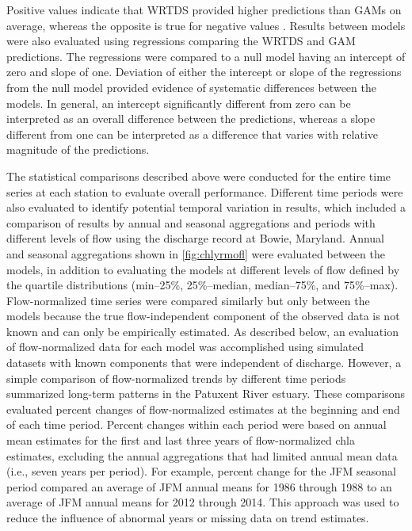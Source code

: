 \documentclass[letterpaper,12pt,oneside]{article}\usepackage[]{graphicx}\usepackage[]{color}
\begin{document}
Positive values indicate that \ac{WRTDS} provided higher predictions than \acp{GAM} on average, whereas the opposite is true for negative values \citep{Moyer12}.  Results between models were also evaluated using regressions comparing the \ac{WRTDS} and \ac{GAM} predictions.  The regressions were compared to a null model having an intercept of zero and slope of one.  Deviation of either the intercept or slope of the regressions from the null model provided evidence of systematic differences between the models.  In general, an intercept significantly different from zero can be interpreted as an overall difference between the predictions, whereas a slope different from one can be interpreted as a difference that varies with relative magnitude of the predictions.

The statistical comparisons described above were conducted for the entire time series at each station to evaluate overall performance.  Different time periods were also evaluated to identify potential temporal variation in results, which included a comparison of results by annual and seasonal aggregations and periods with different levels of flow using the discharge record at Bowie, Maryland.  Annual and seasonal aggregations shown in \cref{fig:chlyrmofl} were evaluated between the models, in addition to evaluating the models at different levels of flow defined by the quartile distributions (min--25\%, 25\%--median, median--75\%, and 75\%--max).  Flow-normalized time series were compared similarly but only between the models because the true flow-independent component of the observed data is not known and can only be empirically estimated.  As described below, an evaluation of flow-normalized data for each model was accomplished using simulated datasets with known components that were independent of discharge.  However, a simple comparison of flow-normalized trends by different time periods summarized long-term patterns in the Patuxent River estuary.  These comparisons evaluated percent changes of flow-normalized estimates at the beginning and end of each time period.  Percent changes within each period were based on annual mean estimates for the first and last three years of flow-normalized \ac{chla} estimates, excluding the annual aggregations that had limited annual mean data (i.e., seven years per period).  For example, percent change for the \ac{JFM} seasonal period compared an average of JFM annual means for 1986 through 1988 to an average of JFM annual means for 2012 through 2014. This approach was used to reduce the influence of abnormal years or missing data on trend estimates.   
\end{document}
